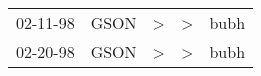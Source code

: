 \begin{supertabular}{p{0.07\textwidth}p{0.06\textwidth}p{0.02\textwidth}p{0.02\textwidth}p{0.06\textwidth}}
 02-11-98\textsuperscript{} &  GSON\textsuperscript{} &  \textgreater &  \textgreater &  bubh\textsuperscript{} \\
 02-20-98\textsuperscript{} &  GSON\textsuperscript{} &  \textgreater &  \textgreater &  bubh\textsuperscript{} \\
\end{supertabular}
